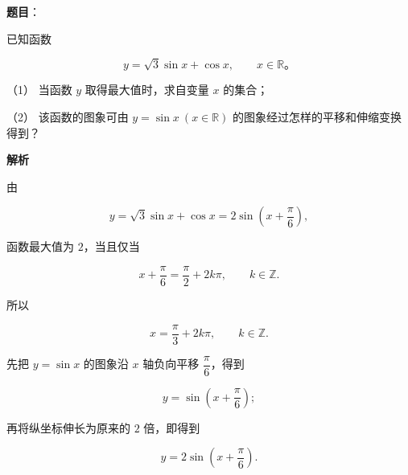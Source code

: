 \begin{answer}

\textbf{题目}：

已知函数

\nopagebreak[4]
\[
y=\sqrt3\sin x+\cos x,\qquad x\in\mathbb R\text{。}
\]

（1） 当函数 $y$ 取得最大值时，求自变量 $x$ 的集合；

（2） 该函数的图象可由 $y=\sin x\ (x\in\mathbb R)$ 的图象经过怎样的平移和伸缩变换得到？

\textbf{解析}


由

\nopagebreak[4]
\[
y=\sqrt3\sin x+\cos x
=2\sin\left(x+\frac\pi6\right),
\]

函数最大值为 $2$，当且仅当

\nopagebreak[4]
\[
x+\frac\pi6=\frac\pi2+2k\pi,
\qquad k\in\mathbb Z.
\]

所以

\nopagebreak[4]
\[
x=\frac\pi3+2k\pi,
\qquad k\in\mathbb Z.
\]


先把 $y=\sin x$ 的图象沿 $x$ 轴负向平移 $\dfrac\pi6$，得到

\nopagebreak[4]
\[
y=\sin\left(x+\frac\pi6\right);
\]

再将纵坐标伸长为原来的 $2$ 倍，即得到

\nopagebreak[4]
\[
y=2\sin\left(x+\frac\pi6\right).
\]



\end{answer}

